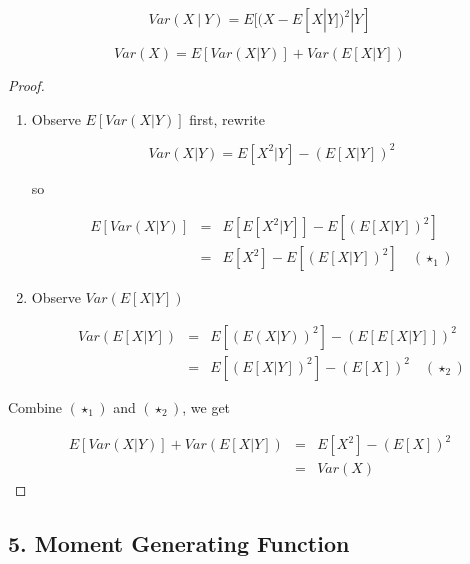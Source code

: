 \begin{defn}

$$Var(X~|~Y) = E[(X - E[X|Y])^2|Y]$$
	
\end{defn}

\begin{prop*}
	$$Var(X) = E[Var(X|Y)] + Var(E[X|Y])$$
\end{prop*}

\begin{proof}$ $
	\begin{enumerate}
		\item Observe $E[Var(X|Y)]$ first, rewrite 
		
		$$Var(X|Y) = E[X^2 | Y] - (E[X|Y])^2$$
		
		so 
		
		\begin{eqnarray*}
			E[Var(X|Y)] &=& E[E[X^2|Y]] - E[(E[X|Y])^2] \\
			&=& E[X^2] - E[(E[X|Y])^2] \quad(\star_1)
		\end{eqnarray*}
		\item Observe $Var(E[X|Y])$
		
		\begin{eqnarray*}
			Var(E[X|Y]) &=& E[(E(X|Y))^2] - (E[E[X|Y]])^2\\
			&=& E[(E[X|Y])^2] - (E[X])^2 \quad(\star_2)
		\end{eqnarray*}
		
	\end{enumerate}
	
	Combine $(\star_1)$ and $(\star_2)$, we get
	
	\begin{eqnarray*}
		E[Var(X|Y)] + Var(E[X|Y]) &=& E[X^2] - (E[X])^2\\
		&=& Var(X)
	\end{eqnarray*}
\end{proof}

\newpage

\subsection*{5. Moment Generating Function}

